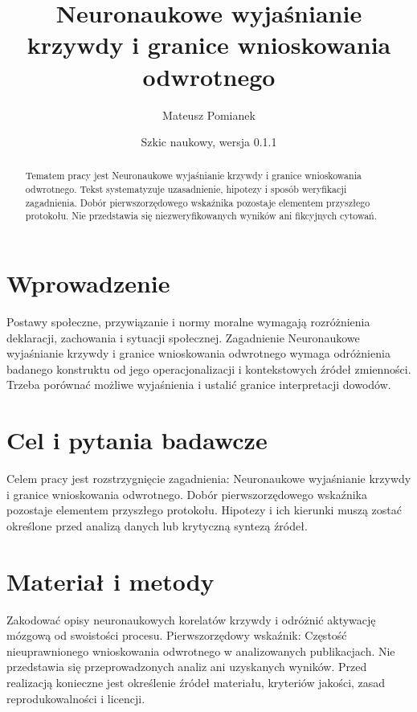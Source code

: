 \documentclass[11pt,a4paper]{article}
\title{Neuronaukowe wyjaśnianie krzywdy i granice wnioskowania odwrotnego}
\author{Mateusz Pomianek}
\date{Szkic naukowy, wersja 0.1.1}
\begin{document}
\maketitle

\begin{abstract}

Tematem pracy jest Neuronaukowe wyjaśnianie krzywdy i granice wnioskowania odwrotnego. Tekst systematyzuje uzasadnienie, hipotezy i sposób weryfikacji zagadnienia. Dobór pierwszorzędowego wskaźnika pozostaje elementem przyszłego protokołu. Nie przedstawia się niezweryfikowanych wyników ani fikcyjnych cytowań.

\end{abstract}

\section{Wprowadzenie}

Postawy społeczne, przywiązanie i normy moralne wymagają rozróżnienia deklaracji, zachowania i sytuacji społecznej. Zagadnienie Neuronaukowe wyjaśnianie krzywdy i granice wnioskowania odwrotnego wymaga odróżnienia badanego konstruktu od jego operacjonalizacji i kontekstowych źródeł zmienności. Trzeba porównać możliwe wyjaśnienia i ustalić granice interpretacji dowodów.

\section{Cel i pytania badawcze}

Celem pracy jest rozstrzygnięcie zagadnienia: Neuronaukowe wyjaśnianie krzywdy i granice wnioskowania odwrotnego. Dobór pierwszorzędowego wskaźnika pozostaje elementem przyszłego protokołu. Hipotezy i ich kierunki muszą zostać określone przed analizą danych lub krytyczną syntezą źródeł.

\section{Materiał i metody}

Zakodować opisy neuronaukowych korelatów krzywdy i odróżnić aktywację mózgową od swoistości procesu. Pierwszorzędowy wskaźnik: Częstość nieuprawnionego wnioskowania odwrotnego w analizowanych publikacjach. Nie przedstawia się przeprowadzonych analiz ani uzyskanych wyników. Przed realizacją konieczne jest określenie źródeł materiału, kryteriów jakości, zasad reprodukowalności i licencji.
\end{document}
